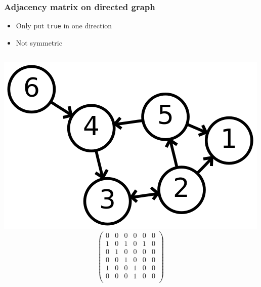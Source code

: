 \documentclass[12pt]{beamer}
\begin{document}
\begin{frame}
\frametitle{Adjacency matrix on directed graph}
\begin{itemize}
\item Only put \texttt{true} in one direction
\item Not symmetric
\end{itemize}
\begin{columns}
\flushright
\includegraphics[width=0.85\linewidth]{img/6n-directed}
\[\left(
\begin{array}{cccccc}
0&0&0&0&0&0\\
1&0&1&0&1&0\\
0&1&0&0&0&0\\
0&0&1&0&0&0\\
1&0&0&1&0&0\\
0&0&0&1&0&0\\
\end{array}
\right)\]
\end{columns}
\end{frame}
\end{document}
